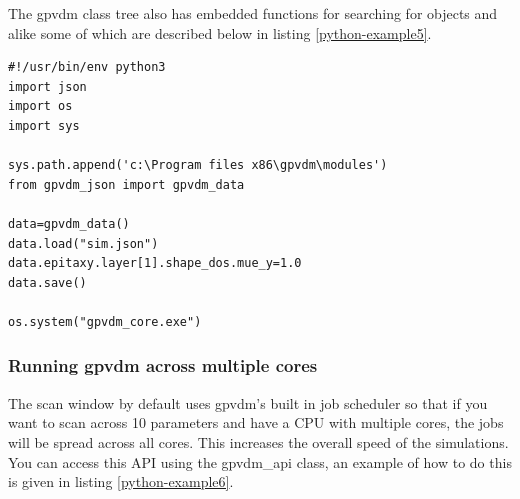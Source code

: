 The gpvdm class tree also has embedded functions for searching for objects and alike some of which are described below in listing \ref{python-example5}.

\begin{listing}
\begin{verbatim}
#!/usr/bin/env python3
import json
import os
import sys

sys.path.append('c:\Program files x86\gpvdm\modules')
from gpvdm_json import gpvdm_data

data=gpvdm_data()
data.load("sim.json")
data.epitaxy.layer[1].shape_dos.mue_y=1.0
data.save()

os.system("gpvdm_core.exe")

\end{verbatim}
\caption{Editing sim.json files using gpvdm's built in classes.} 
\label{python-example5}
\end{listing}

\subsubsection{Running gpvdm across multiple cores}
The scan window by default uses gpvdm's built in job scheduler so that if you want to scan across 10 parameters and have a CPU with multiple cores, the jobs will be spread across all cores.  This increases the overall speed of the simulations. You can access this API using the gpvdm\_api class, an example of how to do this is given in listing \ref{python-example6}.

